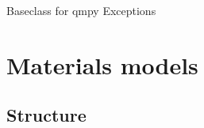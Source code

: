 \documentclass[letterpaper,10pt,english]{sphinxmanual}
\begin{document}
\begin{fulllineitems}
\label{models:qmpy.qmpyBaseError}
Baseclass for qmpy Exceptions

\end{fulllineitems}



\section{Materials models}
\label{models:materials-models}

\subsection{Structure}
\label{models:structure}
\end{document}
